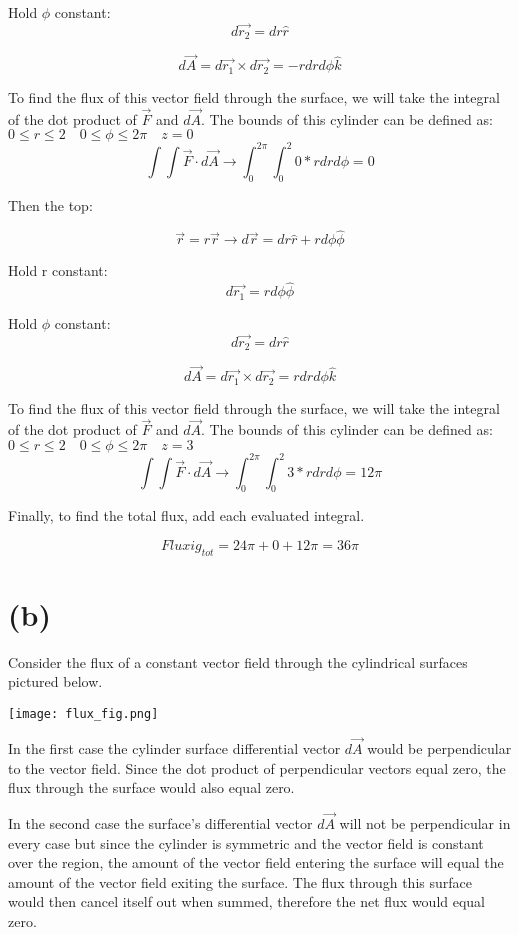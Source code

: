 \documentclass[11pt]{article}
\begin{document}
Hold $\phi$ constant:
$$d\vec{r_2} = dr\hat{r}$$


$$d\vec{A} = d\vec{r_1} \times d\vec{r_2} = -rdrd\phi\hat{k}$$

To find the flux of this vector field through the surface, we will take the integral of the dot product of $\vec{F}$ and $d\vec{A}$. The bounds of this cylinder can be defined as: $0 \leq r \leq 2 \quad 0 \leq \phi \leq 2\pi \quad z = 0$
$$\int\int\vec{F} \cdot d\vec{A} \rightarrow \int_0^{2\pi}\int_0^2 0*r dr d\phi = 0$$

Then the top:

$$\vec{r} = r\vec{r} \rightarrow d\vec{r} = dr\hat{r} + rd\phi \hat{\phi}$$

Hold r constant:
$$d\vec{r_1} = rd\phi\hat{\phi}$$

Hold $\phi$ constant:
$$d\vec{r_2} = dr\hat{r}$$


$$d\vec{A} = d\vec{r_1} \times d\vec{r_2} = rdrd\phi\hat{k}$$

To find the flux of this vector field through the surface, we will take the integral of the dot product of $\vec{F}$ and $d\vec{A}$. The bounds of this cylinder can be defined as: $0 \leq r \leq 2 \quad 0 \leq \phi \leq 2\pi \quad z = 3$
$$\int\int\vec{F} \cdot d\vec{A} \rightarrow \int_0^{2\pi}\int_0^2 3*r dr d\phi = 12\pi$$

Finally, to find the total flux, add each evaluated integral.

$$Fluxi g_{tot} = 24\pi + 0 + 12\pi = 36\pi$$


\section*{(b)}
Consider the flux of a constant vector field through the cylindrical surfaces pictured below.
\begin{center}
    \texttt{[image: flux\_fig.png]}
\end{center}
In the first case the cylinder surface differential vector $d\vec{A}$ would be perpendicular to the vector field. Since the dot product of perpendicular vectors equal zero, the flux through the surface would also equal zero.

In the second case the surface's differential vector $d\vec{A}$ will not be perpendicular in every case but since the cylinder is symmetric and the vector field is constant over the region, the amount of the vector field entering the surface will equal the amount of the vector field exiting the surface. The flux through this surface would then cancel itself out when summed, therefore the net flux would equal zero.
\end{document}

